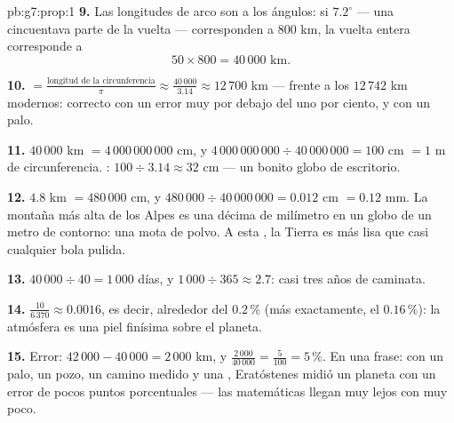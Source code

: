 \begin{solution}{pb:g7:prop:1}
\textbf{9.} Las longitudes de arco son  a los ángulos: si
$7.2^\circ$ --- una cincuentava parte de la vuelta --- corresponden a
$800$ km, la vuelta entera corresponde a
\[
50 \times 800 = 40\,000 \text{ km}.
\]

\textbf{10.}  $= \frac{\text{longitud de la circunferencia}}{\pi}
\approx \frac{40\,000}{3.14} \approx 12\,700$ km --- frente a
los $12\,742$ km modernos: correcto con un error muy por debajo del uno por ciento,
y con un palo.

\textbf{11.} $40\,000$ km $= 4\,000\,000\,000$ cm, y
$4\,000\,000\,000 \div 40\,000\,000 = 100$ cm $= 1$ m de
circunferencia. : $100 \div 3.14 \approx 32$ cm --- un
bonito globo de escritorio.

\textbf{12.} $4.8$ km $= 480\,000$ cm, y
$480\,000 \div 40\,000\,000 = 0.012$ cm $= 0.12$ mm. La
montaña más alta de los Alpes es una décima de milímetro en un
globo de un metro de contorno: una mota de polvo. A esta , la Tierra es
más lisa que casi cualquier bola pulida.

\textbf{13.} $40\,000 \div 40 = 1\,000$ días, y
$1\,000 \div 365 \approx 2.7$: casi tres años de caminata.

\textbf{14.} $\frac{10}{6\,370} \approx 0.0016$, es decir, alrededor del
$0.2\,\%$ (más exactamente, el $0.16\,\%$): la atmósfera es una
piel finísima sobre el planeta.

\textbf{15.} Error: $42\,000 - 40\,000 = 2\,000$ km, y
$\frac{2\,000}{40\,000} = \frac{5}{100} = 5\,\%$. En una frase:
con un palo, un pozo, un camino medido y una ,
Eratóstenes midió un planeta con un error de pocos puntos porcentuales ---
las matemáticas llegan muy lejos con muy poco.
\end{solution}
